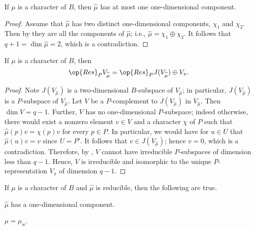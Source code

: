 \documentclass[../main.tex]{subfiles}
\begin{document}
\begin{lemma}
	If $\mu$ is a character of $B$, then $\widehat\mu$ has at most one one-dimensional component.
\end{lemma}
\begin{proof}
	Assume that $\widehat\mu$ has two distinct one-dimensional components, $\chi_1$ and $\chi_2$. Then by  they are all the components of $\widehat\mu$; i.e., $\widehat\mu=\chi_1\oplus\chi_2$. It follows that $q+1=\dim\widehat\mu=2$, which is a contradiction.
\end{proof}
\begin{lemma} \label{lem:decomp-res-mu-hat}
	If $\mu$ is a character of $B$, then
	\[\op{Res}_PV_{\widehat\mu}=\op{Res}_PJ(V_{\widehat\mu})\oplus V_\pi.\]
\end{lemma}
\begin{proof}
	Note $J(V_{\widehat\mu})$ is a two-dimensional $B$-subspace of $V_{\widehat\mu}$; in particular, $J(V_{\widehat\mu})$ is a $P$-subspace of $V_{\widehat\mu}$. Let $V$ be a $P$-complement to $J(V_{\widehat\mu})$ in $V_{\widehat\mu}$. Then $\dim V=q-1$. Further, $V$ has no one-dimensional $P$-subspace; indeed otherwise, there would exist a nonzero element $v\in V$ and a character $\chi$ of $P$ such that $\widehat\mu(p)v=\chi(p)v$ for every $p\in P$. In particular, we would have for $u\in U$ that $\widehat\mu(u)v=v$ since $U=P'$. It follows that $v\in J\left(V_{\widehat\mu}\right)$; hence $v=0$, which is a contradiction. Therefore, by , $V$ cannot have irreducible $P$-subspaces of dimension less than $q-1$. Hence, $V$ is irreducible and isomorphic to the unique $P$-representation $V_\pi$ of dimension $q-1$.
\end{proof}
\begin{lemma} \label{lem:mu-hat-red}
	If $\mu$ is a character of $B$ and $\widehat\mu$ is reducible, then the following are true.
	\begin{listalph}
		\item $\widehat\mu$ has a one-dimensional component.
		\item $\mu=\mu_w$.
	\end{listalph}
\end{lemma}
\end{document}
